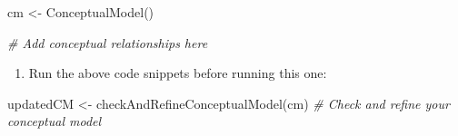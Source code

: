 \documentclass[
]{article}
\newenvironment{Shaded}{\begin{snugshade}}{\end{snugshade}}
\newcommand{\CommentTok}[1]{\textcolor[rgb]{0.56,0.35,0.01}{\textit{#1}}}
\newcommand{\FunctionTok}[1]{\textcolor[rgb]{0.00,0.00,0.00}{#1}}
\newcommand{\NormalTok}[1]{#1}
\newcommand{\OtherTok}[1]{\textcolor[rgb]{0.56,0.35,0.01}{#1}}
\providecommand{\tightlist}{%
  \setlength{\itemsep}{0pt}\setlength{\parskip}{0pt}}
\begin{document}
\begin{Shaded}
\begin{Highlighting}[]
\NormalTok{cm }\OtherTok{\textless{}{-}} \FunctionTok{ConceptualModel}\NormalTok{()}

\CommentTok{\# Add conceptual relationships here}
\end{Highlighting}
\end{Shaded}

\begin{enumerate}
\def\labelenumi{\arabic{enumi}.}
\setcounter{enumi}{2}
\tightlist
\item
  Run the above code snippets before running this one:
\end{enumerate}

\begin{Shaded}
\begin{Highlighting}[]
\NormalTok{updatedCM }\OtherTok{\textless{}{-}} \FunctionTok{checkAndRefineConceptualModel}\NormalTok{(cm) }\CommentTok{\# Check and refine your conceptual model}
\end{Highlighting}
\end{Shaded}
\end{document}
